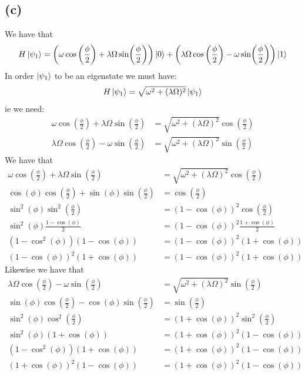 \documentclass[11pt]{article}
\begin{document}
\subsection*{(c)}
We have that 
$$H\ket{\psi_1}=\left(\omega\cos\left(\frac{\phi}{2}\right)
+\lambda\Omega\sin(\frac{\phi}{2})\right)\ket{0}+\left(\lambda\Omega\cos\left(\frac{\phi}{2}\right)
-\omega\sin(\frac{\phi}{2})\right)\ket{1}$$
In order $\ket{\psi_1}$ to be an eigenstate we must have:
$$
H\ket{\psi_1} = \sqrt{\omega^2+(\lambda\Omega)^2}\ket{\psi_1}
$$
ie we need:
\begin{align*}
    \omega\cos\left(\frac{\phi}{2}\right)
+\lambda\Omega\sin\left(\frac{\phi}{2}\right)
& = \sqrt{\omega^2+(\lambda\Omega)^2} \cos\left(\frac{\phi}{2}\right)
\\
\lambda\Omega\cos\left(\frac{\phi}{2}\right)
-\omega\sin\left(\frac{\phi}{2}\right) & = \sqrt{\omega^2+(\lambda\Omega)^2} \sin\left(\frac{\phi}{2}\right)
\end{align*}
We have that
\begin{align*}
    \omega\cos\left(\frac{\phi}{2}\right)
+\lambda\Omega\sin\left(\frac{\phi}{2}\right)
& = \sqrt{\omega^2+(\lambda\Omega)^2} \cos\left(\frac{\phi}{2}\right)
\\
\cos(\phi)\cos\left(\frac{\phi}{2}\right)+
\sin(\phi)\sin\left(\frac{\phi}{2}\right) &= \cos\left(\frac{\phi}{2}\right)\\
\sin^2(\phi)\sin^2\left(\frac{\phi}{2}\right) &= (1-\cos(\phi))^2\cos\left(\frac{\phi}{2}\right)\\
\sin^2(\phi)\frac{1-\cos(\phi)}{2} &= (1-\cos(\phi))^2\frac{1+\cos(\phi)}{2}\\
(1-\cos^2(\phi))(1-\cos(\phi))&=(1-\cos(\phi))^2(1+\cos(\phi))\\
(1-\cos(\phi))^2(1+\cos(\phi))&=(1-\cos(\phi))^2(1+\cos(\phi))
\end{align*}
Likewise we have that 
\begin{align*}
    \lambda\Omega\cos\left(\frac{\phi}{2}\right)
    -\omega\sin\left(\frac{\phi}{2}\right) & = \sqrt{\omega^2+(\lambda\Omega)^2} \sin\left(\frac{\phi}{2}\right)\\
    \sin(\phi)\cos\left(\frac{\phi}{2}\right)-\cos(\phi)\sin\left(
    \frac{\phi}{2}\right) &= \sin\left(\frac{\phi}{2}\right)\\
    \sin^2(\phi)\cos^2\left(\frac{\phi}{2}\right) &= (1+\cos(\phi))^2\sin^2\left(\frac{\phi}{2}\right)\\
    \sin^2(\phi)(1+\cos(\phi)) &= (1+\cos(\phi))^2(1-\cos(\phi))\\
    (1-\cos^2(\phi))(1+\cos(\phi)) &= (1+\cos(\phi))^2(1-\cos(\phi))\\
    (1+\cos(\phi))^2(1-\cos(\phi)) &= (1+\cos(\phi))^2(1-\cos(\phi))
\end{align*}
\end{document}
